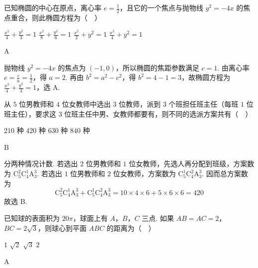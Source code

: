 \begin{problem}
已知椭圆的中心在原点，离心率 \( e = \frac{1}{2} \)，且它的一个焦点与抛物线 \( y^{2} = -4x \) 的焦点重合，则此椭圆方程为（\(\quad\)）

\choices
    {\(\frac{x^2}{4} +\frac{y^2}{3} = 1\)}
    {\(\frac{x^2}{8} +\frac{y^2}{6} = 1\)}
    {\(\frac{x^2}{2} + y^2 = 1\)}
    {\(\frac{x^2}{4} + y^2 = 1\)}
\end{problem}

\begin{answer}
A
\end{answer}

\begin{solution}
抛物线 \(y^2=-4x\) 的焦点为 \((-1,0)\)，所以椭圆的焦距参数满足 \(c=1\). 由离心率 \(e=\frac ca=\frac12\)，得 \(a=2\). 再由 \(b^2=a^2-c^2\)，得 \(b^2=4-1=3\)，故椭圆方程为 \(\frac{x^2}{4}+\frac{y^2}{3}=1\)，选 A.
\end{solution}

\begin{problem}
从 \(5\) 位男教师和 \(4\) 位女教师中选出 \(3\) 位教师，派到 \(3\) 个班担任班主任（每班 \(1\) 位班主任），要求这 \(3\) 位班主任中男、女教师都要有，则不同的选派方案共有（\(\quad\)）

\choices
    {\(210\) 种}
    {\(420\) 种}
    {\(630\) 种}
    {\(840\) 种}
\end{problem}

\begin{answer}
B
\end{answer}

\begin{solution}
分两种情况计数. 若选出 \(2\) 位男教师和 \(1\) 位女教师，先选人再分配到班级，方案数为 \(\mathrm C_{5}^{2}\mathrm C_{4}^{1}\mathrm A_{3}^{3}\). 若选出 \(1\) 位男教师和 \(2\) 位女教师，方案数为 \(\mathrm C_{5}^{1}\mathrm C_{4}^{2}\mathrm A_{3}^{3}\). 因而总方案数为
\[
\mathrm C_{5}^{2}\mathrm C_{4}^{1}\mathrm A_{3}^{3}+\mathrm C_{5}^{1}\mathrm C_{4}^{2}\mathrm A_{3}^{3}
=10\times4\times6+5\times6\times6=420
\]
故选 B.
\end{solution}

\begin{problem}
已知球的表面积为 \(20\pi\)，球面上有 \(A\)，\(B\)，\(C\) 三点. 如果 \(AB = AC = 2\)，\(BC = 2\sqrt{3}\)，则球心到平面 \(ABC\) 的距离为（\(\quad\)）

\choices
    {\(1\)}
    {\(\sqrt{2}\)}
    {\(\sqrt{3}\)}
    {\(2\)}
\end{problem}

\begin{answer}
A
\end{answer}

